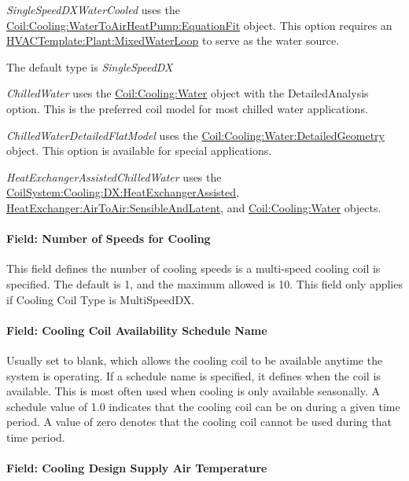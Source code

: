 \emph{SingleSpeedDXWaterCooled} uses the \hyperref[coilcoolingwatertoairheatpumpequationfit]{Coil:Cooling:WaterToAirHeatPump:EquationFit} object. This option requires an \hyperref[hvactemplateplantmixedwaterloop]{HVACTemplate:Plant:MixedWaterLoop} to serve as the water source.

The default type is \emph{SingleSpeedDX}

\emph{ChilledWater} uses the \hyperref[coilcoolingwater]{Coil:Cooling:Water} object with the DetailedAnalysis option. This is the preferred coil model for most chilled water applications.

\emph{ChilledWaterDetailedFlatModel} uses the \hyperref[coilcoolingwaterdetailedgeometry]{Coil:Cooling:Water:DetailedGeometry} object. This option is available for special applications.

\emph{HeatExchangerAssistedChilledWater} uses the \hyperref[coilsystemcoolingdxheatexchangerassisted]{CoilSystem:Cooling:DX:HeatExchangerAssisted}, \hyperref[heatexchangerairtoairsensibleandlatent]{HeatExchanger:AirToAir:SensibleAndLatent}, and \hyperref[coilcoolingwater]{Coil:Cooling:Water} objects.

\paragraph{Field: Number of Speeds for Cooling}\label{field-number-of-speeds-for-cooling}

This field defines the number of cooling speeds is a multi-speed cooling coil is specified. The default is 1, and the maximum allowed is 10. This field only applies if Cooling Coil Type is MultiSpeedDX.

\paragraph{Field: Cooling Coil Availability Schedule Name}\label{field-cooling-coil-availability-schedule-name-6}

Usually set to blank, which allows the cooling coil to be available anytime the system is operating. If a schedule name is specified, it defines when the coil is available. This is most often used when cooling is only available seasonally. A schedule value of 1.0 indicates that the cooling coil can be on during a given time period. A value of zero denotes that the cooling coil cannot be used during that time period.

\paragraph{Field: Cooling Design Supply Air Temperature}\label{field-cooling-design-supply-air-temperature-2}

